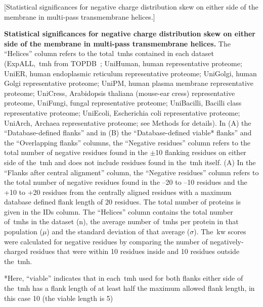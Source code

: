 \begin{table}[htbp]
  \centering
  [Statistical significances for negative charge distribution skew on either side of the membrane in multi\--pass transmembrane helices.]{\textbf{Statistical significances for negative charge distribution skew on either side of the membrane in multi\--pass transmembrane helices.}
The ``Helices'' column refers to the total~\gls{tmh}s contained in each dataset (ExpALL,~\gls{tmh} from TOPDB~\cite{Dobson2015}; UniHuman, human representative proteome; UniER, human endoplasmic reticulum representative proteome; UniGolgi, human Golgi representative proteome; UniPM, human plasma membrane representative proteome; UniCress, Arabidopsis thaliana (mouse-ear cress) representative proteome, UniFungi, fungal representative proteome; UniBacilli, Bacilli class representative proteome; UniEcoli, Escherichia coli representative proteome; UniArch, Archaea representative proteome; see Methods for details).
In (A) the ``Database-defined flanks'' and in (B) the ``Database-defined viable* flanks'' and the ``Overlapping flanks'' columns, the ``Negative residues'' column refers to the total number of negative residues found in the $\pm$10 flanking residues on either side of the~\gls{tmh} and does not include residues found in the~\gls{tmh} itself.
(A) In the ``Flanks after central alignment'' column, the ``Negative residues'' column refers to the total number of negative residues found in the –20 to –10 residues and the +10 to +20 residues from the centrally aligned residues with a maximum database defined flank length of 20 residues.
The total number of proteins is given in the IDs column.
The ``Helices'' column contains the total number of~\gls{tmh}s in the dataset (n), the average number of~\gls{tmh}s per protein in that population ($\mu$) and the standard deviation of that average ($\sigma$).
The~\gls{kw} scores were calculated for negative residues by comparing the number of negatively\--charged residues that were within 10 residues inside and 10 residues outside the~\gls{tmh}.

*Here, ``viable'' indicates that in each~\gls{tmh} used for both flanks either side of the~\gls{tmh} has a flank length of at least half the maximum allowed flank length, in this case 10 (the viable length is 5)}


\end{table}
